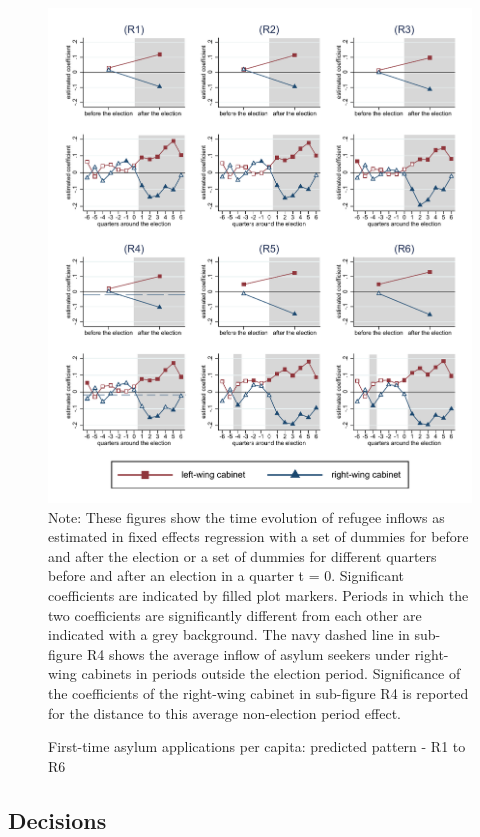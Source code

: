 \documentclass[a4paper,12pt]{article}
\begin{document}
\begin{figure}
	\caption{First-time asylum applications per capita: predicted pattern - R1 to R6}
	\includegraphics[width=1\textwidth]{../results/applications/app_graphs_R1-R6.pdf}
	\scriptsize{Note: These figures show the time evolution of refugee inflows as estimated in fixed effects regression with a set of dummies for before and after the election or a set of dummies for different quarters before and after an election in a quarter t = 0. Significant coefficients are indicated by filled plot markers. Periods in which the two coefficients are significantly different from each other are indicated with a grey background. The navy dashed line in sub-figure R4 shows the average inflow of asylum seekers under right-wing cabinets in periods outside the election period. Significance of the coefficients of the right-wing cabinet in sub-figure R4 is reported for the distance to this average non-election period effect.}
	\label{graph_robustness}
\end{figure} 

   
\subsection{Decisions}
\end{document}
